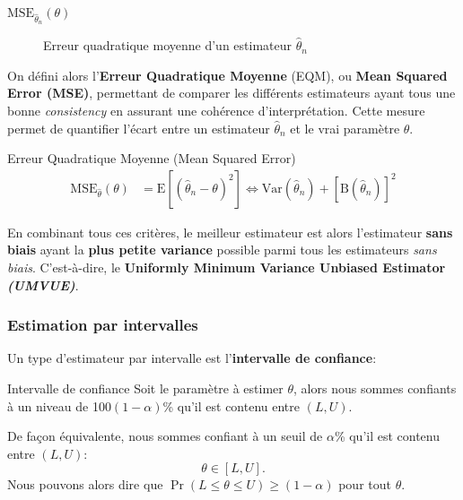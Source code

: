 \documentclass[10pt, french]{article}
\begin{document}
\begin{multicols*}{2}
\begin{distributions}[Notation]
\begin{description}
	\item[$\text{MSE}_{\hat{\theta}_{n}}(\theta)$]	Erreur quadratique moyenne d'un estimateur $\hat{\theta}_{n}$
\end{description}
\end{distributions}

On défini alors l'\textbf{Erreur Quadratique Moyenne} (EQM), ou \textbf{Mean Squared Error (MSE)}, permettant de comparer les différents estimateurs ayant tous une bonne \textit{consistency} en assurant une cohérence d'interprétation. Cette mesure permet de quantifier l'écart entre un estimateur $\hat{\theta}_{n}$ et le vrai paramètre $\theta$.

\begin{algo}{Erreur Quadratique Moyenne (Mean Squared Error)}
\begin{align*}
	\text{MSE}_{\hat\theta}(\theta)
	&=	\text{E}[(\hat{\theta}_{n} - \theta)^{2}]
	\Leftrightarrow	\text{Var}(\hat{\theta}_{n}) + \left[\text{B}(\hat{\theta}_{n})\right]^{2}
\end{align*}
\end{algo}

En combinant tous ces critères, le meilleur estimateur est alors l'estimateur \textbf{sans biais} ayant la \textbf{plus petite variance} possible parmi tous les estimateurs \textit{sans biais}. C'est-à-dire, le \textbf{Uniformly Minimum Variance Unbiased Estimator \textit{(UMVUE)}}.

\columnbreak

\subsubsection*{Estimation par intervalles}

Un type d'estimateur par intervalle est l'\textbf{intervalle de confiance}:
\begin{algo}{Intervalle de confiance}
Soit le paramètre à estimer $\theta$, alors nous sommes confiants à un niveau de 100$(1 - \alpha)$\% qu'il est contenu entre $(L, U)$. 

De façon équivalente, nous sommes confiant à un seuil de $\alpha$\% qu'il est contenu entre $(L, U)$: 
\begin{equation*}
	\theta \in \left[ L, U\right].
\end{equation*}
Nous pouvons alors dire que $\Pr(L \le \theta \le U) \ge (1 - \alpha)$ pour tout $\theta$.
\end{algo}


\end{multicols*}
\end{document}
